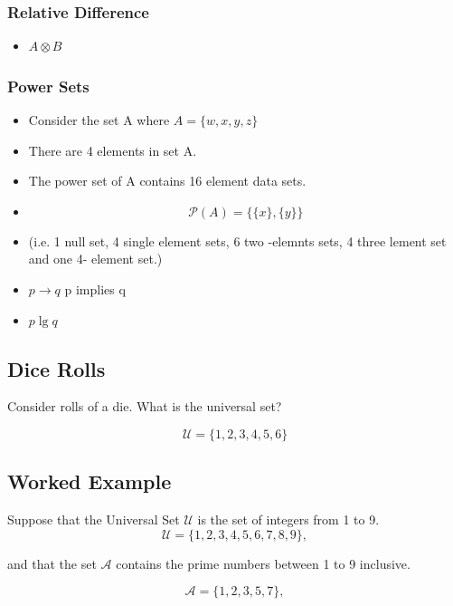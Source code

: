 \documentclass{article}
\begin{document}
\subsubsection*{Relative Difference}
\begin{itemize}
	\item $ A \otimes B$
\end{itemize}
\subsubsection*{Power Sets}
\begin{itemize}
	\item Consider the set A where $ A = \{w,x,y,z\}$
	\item There are 4 elements in set A.
	\item The power set of A contains 16 element data sets.
	\item \[  \mathcal{P}(A) = \{\{ x \}, \{ y \} \}  \]
	\item (i.e. 1 null set, 4 single element sets, 6 two -elemnts sets, 4 three lement set and one 4- element set.)
\end{itemize}
\newpage
\begin{itemize}
	\item $ p \rightarrow q$  p implies q
	\item $p \lg q $
\end{itemize}
\subsection*{Dice Rolls}
Consider rolls of a die. What is the universal set?

\[ \mathcal{U} = \{1,2,3,4,5,6\} \]

\subsection*{Worked Example}

Suppose that the Universal Set $\mathcal{U}$ is the set of integers from 1 to 9.
\[ \mathcal{U} = \{1,2,3,4,5,6,7,8,9\}, \]

and that the set $\mathcal{A}$ contains the prime numbers between 1 to 9 inclusive.

\[ \mathcal{A} = \{1,2,3,5,7\}, \]
\end{document}
